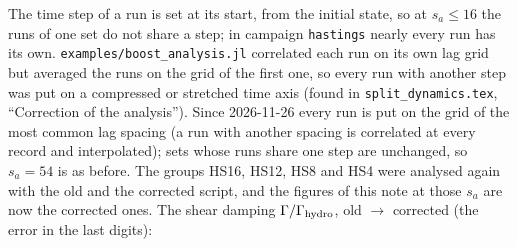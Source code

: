 \documentclass[11pt,aps,preprint,nofootinbib,superscriptaddress,tightenlines]{revtex4-2}
\begin{document}
The time step of a run is set at its start, from the initial state, so at $s_a\le16$ the runs of one set do not share a step; in campaign
\texttt{hastings} nearly every run has its own.  \texttt{examples/boost\_analysis.jl} correlated each run on its own lag grid but averaged the runs on
the grid of the first one, so every run with another step was put on a compressed or stretched time axis (found in \nolinkurl{split_dynamics.tex},
``Correction of the analysis'').  Since 2026-11-26 every run is put on the grid of the most common lag spacing (a run with another spacing is
correlated at every record and interpolated); sets whose runs share one step are unchanged, so $s_a=54$ is as before.  The groups HS16, HS12, HS8 and HS4
were analysed again with the old and the corrected script, and the figures of this note at those $s_a$ are now the corrected ones.  The shear damping
$\Gamma/\Gamma_{\rm hydro}$, old $\to$ corrected (the error in the last digits):
\end{document}
